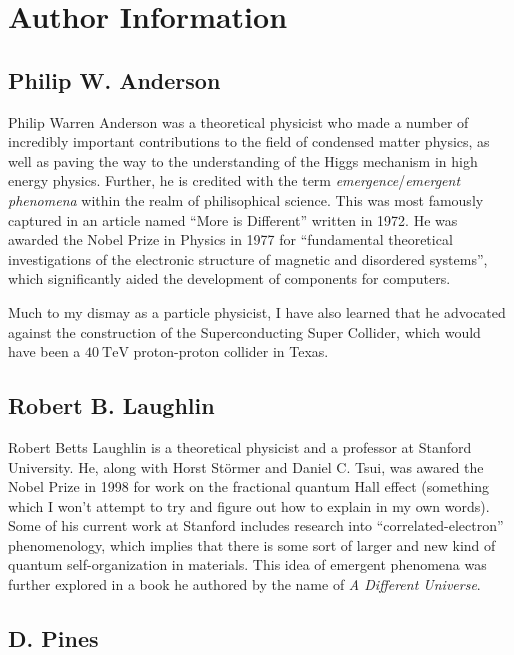 \section{Author Information}


\subsection{Philip W. Anderson}

Philip Warren Anderson was a theoretical physicist who made a number of incredibly important contributions to the field of condensed matter physics, as well as paving the way to the understanding of the Higgs mechanism in high energy physics. Further, he is credited with the term \textit{emergence}/\textit{emergent phenomena} within the realm of philisophical science. This was most famously captured in an article named ``More is Different'' written in 1972. He was awarded the Nobel Prize in Physics in 1977 for ``fundamental theoretical investigations of the electronic structure of magnetic and disordered systems'', which significantly aided the development of components for computers.

Much to my dismay as a particle physicist, I have also learned that he advocated against the construction of the Superconducting Super Collider, which would have been a $\qty{40}{\tera\electronvolt}$ proton-proton collider in Texas.




\subsection{Robert B. Laughlin}

Robert Betts Laughlin is a theoretical physicist and a professor at Stanford University. He, along with Horst Störmer and Daniel C. Tsui, was awared the Nobel Prize in 1998 for work on the fractional quantum Hall effect (something which I won't attempt to try and figure out how to explain in my own words). Some of his current work at Stanford includes research into ``correlated-electron'' phenomenology, which implies that there is some sort of larger and new kind of quantum self-organization in materials. This idea of emergent phenomena was further explored in a book he authored by the name of \textit{A Different Universe}.




\subsection{D. Pines}


